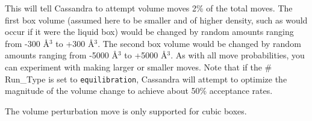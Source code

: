 %
This will tell Cassandra to attempt volume moves 2\% of the
total moves. The first box volume (assumed here to be smaller and of higher
density, such as would occur if it were the liquid box) would be
changed by random amounts ranging from 
-300 \AA $^3$ to +300 \AA $^3$. The second box volume would be
changed by random amounts ranging from
-5000 \AA $^3$ to +5000 \AA $^3$. As with all move probabilities, you
can experiment with making 
larger or smaller moves. Note that if the \# Run\_Type is set
to {\tt equilibration}, Cassandra will attempt to optimize the magnitude of
the volume change to achieve about 50\% acceptance rates. 

The volume perturbation move is only supported for cubic boxes. 
%                                                                                                                                           
%                





%
%
